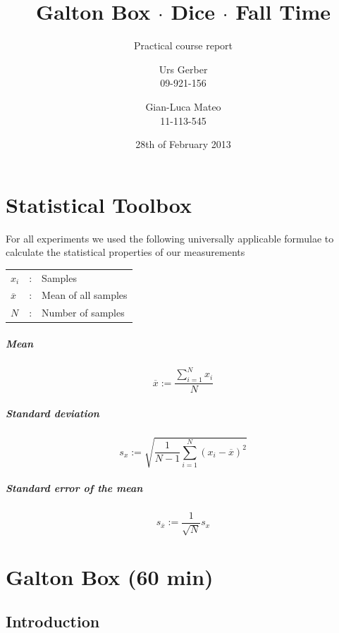 \documentclass{scrreprt}
\author{Urs Gerber\\09-921-156 \and Gian-Luca Mateo\\11-113-545}
\date{28th of February 2013}
\title{Galton Box $\cdot$ Dice $\cdot$ Fall Time}
\subtitle{Practical course report}
\begin{document}
\maketitle

\tableofcontents

\newpage

\chapter{Statistical Toolbox}
For all experiments we used the following universally applicable formulae to calculate the statistical properties of our measurements
\begin{center}
    \begin{tabular}{lcl}
    $x_i$ & : & Samples\\
	$\overline{x}$ & : & Mean of all samples\\
	$N$ & : & Number of samples
\end{tabular}
\end{center}

\paragraph*{Mean}
\begin{equation}
\overline{x}:=\frac{\sum_{i=1}^N{x_i}}{N}
\end{equation}

\paragraph*{Standard deviation}
\begin{equation}
s_x:=\sqrt{\frac{1}{N-1}\sum_{i=1}^N{(x_i-\overline{x})^2}}
\end{equation}

\paragraph*{Standard error of the mean}
\begin{equation}
s_{\overline{x}}:= \frac{1}{\sqrt{N}} s_x
\end{equation}

\chapter[Galton Box]{Galton Box (60 min)}
\section{Introduction}
\end{document}
